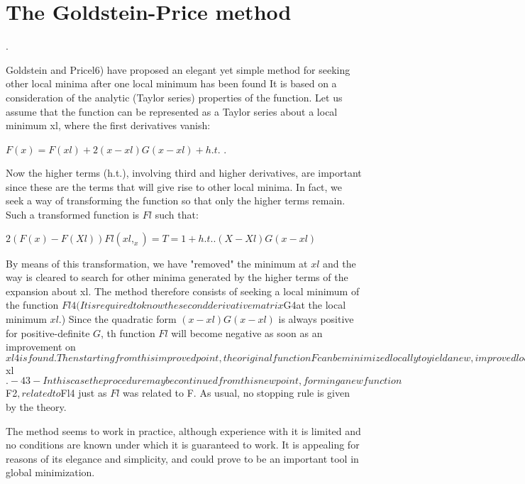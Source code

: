  
\section{The Goldstein-Price method}
 .
 
     Goldstein and Pricel6) have proposed an elegant yet simple method
for seeking other local minima after one local minimum has been found
It is based on a consideration of the analytic (Taylor series) properties
of the function.  Let us assume that the function can be represented as
a Taylor series about a local minimum xl, where the first derivatives
vanish:
 
                $F(x) = F(xl) + 2 (x - xl) G(x -xl) + h.t.$ .
 
Now the higher terms (h.t.), involving third and higher derivatives, are
important since these are the terms that will give rise to other local
minima.  In fact, we seek a way of transforming the function so that only
the higher terms remain.  Such a transformed function is $Fl$ such that:
 
 
                           $2(F(x) - F(Xl))
            Fl(xl,_x) =        T         = 1 + h.t. .
                          (X -Xl) G(x - xl)$
 
 
By means of this transformation, we have "removed" the minimum at $xl$
and the way is cleared to search for other minima generated by the higher
terms of the expansion about xl.  The method therefore consists of
seeking a local minimum of the function $Fl4  (It is required to know the
second derivative matrix $G4at the local minimum $xl$.)  Since the
quadratic form $(x -xl) G(x - xl)$
 is always positive for positive-definite $G$, th
function $Fl$ will become negative as soon as an improvement on $xl4 is
found.  Then starting from this improved point, the original function F
can be minimized locally to yield a new, improved local minimum of F
 
     If the minimum value found for Fl is positive, then it may correspond to a new local minimum of F, but not an improvement over $xl$.
 
 
                               - 43 -
 
 
In this case the procedure may be continued from this new point, forming
a new function $F2$, related to $Fl4 just as $Fl$ was related to F. As usual,
no stopping rule is given by the theory.
 
     The method seems to work in practice, although experience with it
is limited and no conditions are known under which it is guaranteed to
work.  It is appealing for reasons of its elegance and simplicity, and
could prove to be an important tool in global minimization.
 
